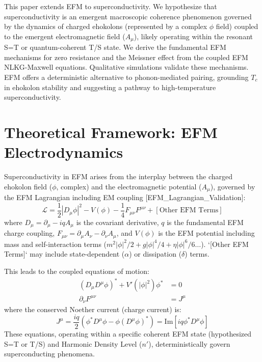 \documentclass[11pt]{article}
\newcommand{\citepaper}[1]{[#1]} %
\begin{document}
This paper extends EFM to superconductivity. We hypothesize that superconductivity is an emergent macroscopic coherence phenomenon governed by the dynamics of charged ehokolons (represented by a complex \(\phi\) field) coupled to the emergent electromagnetic field (\(A_\mu\)), likely operating within the resonant S=T or quantum-coherent T/S state. We derive the fundamental EFM mechanisms for zero resistance and the Meissner effect from the coupled EFM NLKG-Maxwell equations. Qualitative simulations validate these mechanisms. EFM offers a deterministic alternative to phonon-mediated pairing, grounding \(T_c\) in ehokolon stability and suggesting a pathway to high-temperature superconductivity.

\section{Theoretical Framework: EFM Electrodynamics}
Superconductivity in EFM arises from the interplay between the charged ehokolon field (\(\phi\), complex) and the electromagnetic potential (\(A_\mu\)), governed by the EFM Lagrangian including EM coupling \citepaper{EFM_Lagrangian_Validation}:
\begin{equation}
\mathcal{L} = \frac{1}{2} |D_\mu \phi|^2 - V(\phi) - \frac{1}{4}F_{\mu\nu}F^{\mu\nu} + [\text{Other EFM Terms}]
\label{eq:efm_qed_lagrangian}
\end{equation}
where \(D_\mu = \partial_\mu - iqA_\mu\) is the covariant derivative, \(q\) is the fundamental EFM charge coupling, \(F_{\mu\nu} = \partial_\mu A_\nu - \partial_\nu A_\mu\), and \(V(\phi)\) is the EFM potential including mass and self-interaction terms (\(m^2|\phi|^2/2 + g|\phi|^4/4 + \eta|\phi|^6/6 \dots\)). `[Other EFM Terms]` may include state-dependent (\(\alpha\)) or dissipation (\(\delta\)) terms.

This leads to the coupled equations of motion:
\begin{align}
(D_\mu D^\mu \phi)^* + V'(|\phi|^2)\phi^* &= 0 \label{eq:efm_nlkg_complex} \\
\partial_\nu F^{\mu\nu} &= J^\mu \label{eq:efm_maxwell}
\end{align}
where the conserved Noether current (charge current) is:
\begin{equation}
J^\mu = \frac{iq}{2}(\phi^* D^\mu \phi - \phi (D^\mu \phi)^*) = \text{Im}[iq \phi^* D^\mu \phi]
\label{eq:efm_current}
\end{equation}
These equations, operating within a specific coherent EFM state (hypothesized S=T or T/S) and Harmonic Density Level (\(n'\)), deterministically govern superconducting phenomena.
\end{document}
